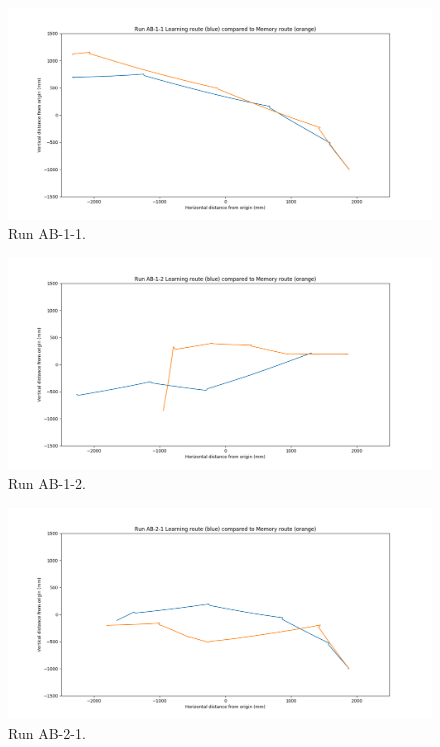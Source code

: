 \documentclass[a4paper,11pt,twoside,openright]{article}
\begin{document}
\begin{figure}[h!]
 \centering
  \includegraphics[width=\textwidth]{AB-1-1}
  \caption{
    \label{fig:ab-1-1} Run AB-1-1.
  }
\end{figure}

\begin{figure}[h!]
 \centering
  \includegraphics[width=\textwidth]{AB-1-2}
  \caption{
    \label{fig:ab-1-2} Run AB-1-2.
  }
\end{figure}

\begin{figure}[h!]
 \centering
  \includegraphics[width=\textwidth]{AB-2-1}
  \caption{
    \label{fig:ab-2-1} Run AB-2-1.
  }
\end{figure}
\end{document}

